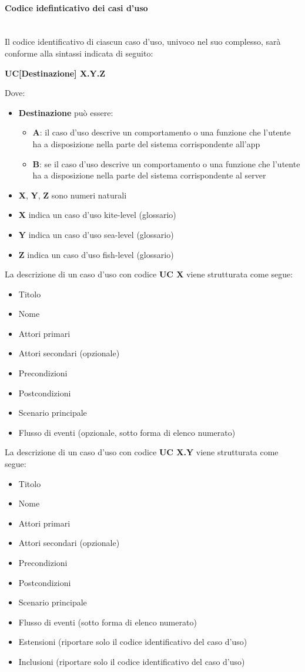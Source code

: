 \paragraph{Codice idefinticativo dei casi d'uso}\mbox{}\\
Il codice identificativo di ciascun caso d’uso, univoco nel suo complesso, sarà conforme alla sintassi indicata di seguito:
\begin{center}
	\textbf{UC[Destinazione] X.Y.Z}
\end{center}
Dove:
\begin{itemize}
	\item \textbf{Destinazione} può essere:
	\begin{itemize}
		\item \textbf{A}: il caso d’uso descrive un comportamento o una funzione che l’utente ha a disposizione nella parte del sistema corrispondente all’app
		\item \textbf{B}: se il caso d’uso descrive un comportamento o una funzione che l’utente ha a disposizione nella parte del sistema corrispondente al server
	\end{itemize}
	\item \textbf{X}, \textbf{Y}, \textbf{Z} sono numeri naturali
	\item \textbf{X} indica un caso d’uso kite-level (glossario)
	\item \textbf{Y} indica un caso d’uso sea-level (glossario)
	\item \textbf{Z} indica un caso d’uso fish-level (glossario)
\end{itemize}
La descrizione di un caso d’uso con codice \textbf{UC X} viene strutturata come segue:
\begin{itemize}
	\item Titolo
	\item Nome
	\item Attori primari
	\item Attori secondari (opzionale)
	\item Precondizioni
	\item Postcondizioni
	\item Scenario principale
	\item Flusso di eventi (opzionale, sotto forma di elenco numerato)	
\end{itemize}
La descrizione di un caso d’uso con codice \textbf{UC X.Y} viene strutturata come segue:
\begin{itemize}
	\item Titolo
	\item Nome
	\item Attori primari
	\item Attori secondari (opzionale)
	\item Precondizioni
	\item Postcondizioni
	\item Scenario principale
	\item Flusso di eventi (sotto forma di elenco numerato)	
	\item Estensioni (riportare solo il codice identificativo del caso d’uso)
	\item Inclusioni (riportare solo il codice identificativo del caso d’uso)	
\end{itemize}
